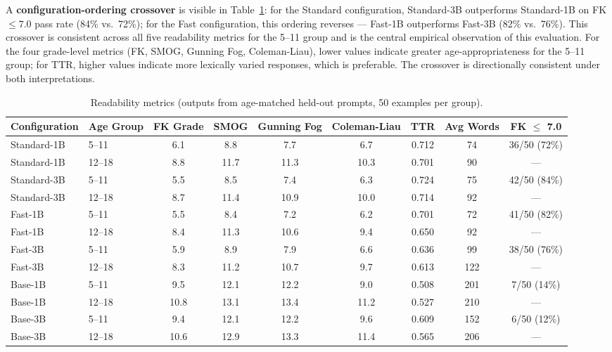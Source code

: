 \documentclass[journal]{IEEEtai}
\begin{document}
A \textbf{configuration-ordering crossover} is visible in Table~\ref{tab:res2}: for the Standard configuration, Standard-3B outperforms Standard-1B on FK $\leq 7.0$ pass rate (84\% vs.\ 72\%); for the Fast configuration, this ordering reverses --- Fast-1B outperforms Fast-3B (82\% vs.\ 76\%). This crossover is consistent across all five readability metrics for the 5--11 group and is the central empirical observation of this evaluation. For the four grade-level metrics (FK, SMOG, Gunning Fog, Coleman-Liau), lower values indicate greater age-appropriateness for the 5--11 group; for TTR, higher values indicate more lexically varied responses, which is preferable. The crossover is directionally consistent under both interpretations.

\begin{table}[!t]
  \caption{Readability metrics (outputs from age-matched held-out prompts, 50 examples per group).}
  \label{tab:res2}
  \small
  \begin{tabular}{llccccccc}
    \hline
    Configuration & Age Group & FK Grade & SMOG & Gunning Fog & Coleman-Liau & TTR & Avg Words & FK $\leq$ 7.0 \\
    \hline
    Standard-1B & 5--11  & 6.1  & 8.8  & 7.7  & 6.7  & 0.712 & 74  & 36/50 (72\%) \\
    Standard-1B & 12--18 & 8.8  & 11.7 & 11.3 & 10.3 & 0.701 & 90  & ---          \\
    Standard-3B & 5--11  & 5.5  & 8.5  & 7.4  & 6.3  & 0.724 & 75  & 42/50 (84\%) \\
    Standard-3B & 12--18 & 8.7  & 11.4 & 10.9 & 10.0 & 0.714 & 92  & ---          \\
    Fast-1B     & 5--11  & 5.5  & 8.4  & 7.2  & 6.2  & 0.701 & 72  & 41/50 (82\%) \\
    Fast-1B     & 12--18 & 8.4  & 11.3 & 10.6 & 9.4  & 0.650 & 92  & ---          \\
    Fast-3B     & 5--11  & 5.9  & 8.9  & 7.9  & 6.6  & 0.636 & 99  & 38/50 (76\%) \\
    Fast-3B     & 12--18 & 8.3  & 11.2 & 10.7 & 9.7  & 0.613 & 122 & ---          \\
    Base-1B     & 5--11  & 9.5  & 12.1 & 12.2 & 9.0  & 0.508 & 201 & 7/50 (14\%)  \\
    Base-1B     & 12--18 & 10.8 & 13.1 & 13.4 & 11.2 & 0.527 & 210 & ---          \\
    Base-3B     & 5--11  & 9.4  & 12.1 & 12.2 & 9.6  & 0.609 & 152 & 6/50 (12\%)  \\
    Base-3B     & 12--18 & 10.6 & 12.9 & 13.3 & 11.4 & 0.565 & 206 & ---          \\
    \hline
  \end{tabular}
\end{table}
\end{document}
